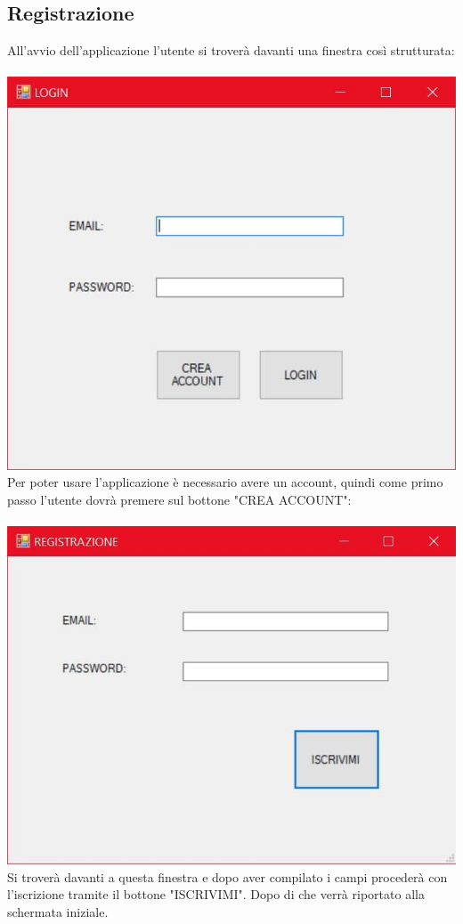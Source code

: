 \documentclass[a4paper, titlepage]{article}
\begin{document}
\subsection{Registrazione}
All'avvio dell'applicazione l'utente si troverà davanti una finestra così strutturata:\\\\
\includegraphics[scale=0.30]{Immagini/form/Form Login.jpg}
\\Per poter usare l'applicazione è necessario avere un account, quindi come primo passo l'utente dovrà premere sul bottone "CREA ACCOUNT":\\\\
\includegraphics[scale=0.30]{Immagini/form/Form Registrazione.jpg}
\\Si troverà davanti a questa finestra e dopo aver compilato i campi procederà con l'iscrizione tramite il bottone "ISCRIVIMI".
Dopo di che verrà riportato alla schermata iniziale.
\newpage
\end{document}
